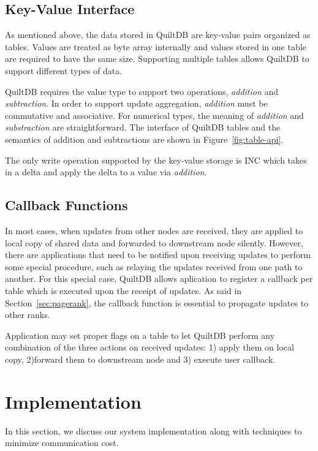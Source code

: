 \documentclass{acm_proc_article-sp}
\begin{document}
\subsection{Key-Value Interface}

As mentioned above, the data stored in QuiltDB are key-value pairs organized 
as tables. Values are treated as byte array internally and values stored in one 
table are required to have the same size. Supporting multiple tables allows 
QuiltDB to support different types of data.

QuiltDB requires the value type to support two operations, \emph{addition} and
\emph{subtraction}. In order to support update aggregation, \emph{addition} must
 be commutative and associative. For numerical types,  the meaning of 
\emph{addition} and \emph{substraction} are straightforward. The interface of 
QuiltDB tables and the semantics of addition and subtractions are shown in
Figure~\ref{fig:table-api}.

The only write operation supported by the key-value storage is INC which takes
in a delta and apply the delta to a value via \emph{addition}.

\subsection{Callback Functions}
\label{sec:callback}

In most cases, when updates from other nodes are received, they are applied to
local copy of shared data and forwarded to downstream node silently.
However, there are applications that need to be notified upon receiving updates
to perform some special procedure, such as relaying the updates received from
one path to another. For this special case, QuiltDB allows aplication to
register a callback per table which is executed upon the receipt of updates. As
said in Section~\ref{sec:pagerank}, the callback function is essential to
propagate updates to other ranks.

Application may set proper flags on a table to let QuiltDB perform any
combination of the three actions on received updates: 1) apply them on local
copy, 2)forward them to downstream node and 3) execute user callback.

\section{Implementation}
In this section, we discuss our system implementation along with techniques to
minimize communication cost.
\end{document}
